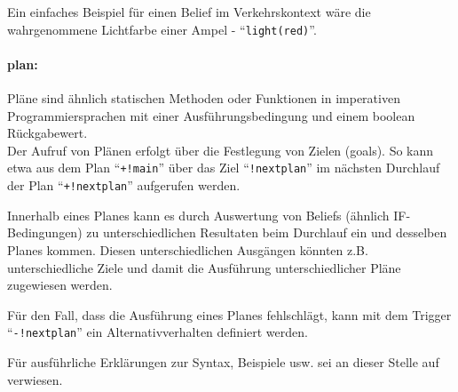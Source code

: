 Ein einfaches Beispiel für einen Belief im Verkehrskontext wäre die wahrgenommene Lichtfarbe einer Ampel - \enquote{\texttt{light(red)}}.

\paragraph*{plan:}
Pläne sind ähnlich statischen Methoden oder Funktionen in imperativen Programmiersprachen mit einer Ausführungsbedingung und einem boolean Rückgabewert.
\\
Der Aufruf von Plänen erfolgt über die Festlegung von Zielen (goals).
So kann etwa aus dem Plan \enquote{\texttt{+!main}} über das Ziel \enquote{\texttt{!nextplan}} im nächsten Durchlauf der Plan \enquote{\texttt{+!nextplan}} aufgerufen werden.

Innerhalb eines Planes kann es durch Auswertung von Beliefs (ähnlich IF-Bedingungen) zu unterschiedlichen Resultaten beim Durchlauf ein und desselben Planes kommen.
Diesen unterschiedlichen Ausgängen könnten z.B. unterschiedliche Ziele und damit die Ausführung unterschiedlicher Pläne zugewiesen werden.

Für den Fall, dass die Ausführung eines Planes fehlschlägt, kann mit dem Trigger \enquote{\texttt{-!nextplan}} ein Alternativverhalten definiert werden.

\par\vspace{2.5em}
Für ausführliche Erklärungen zur Syntax, Beispiele usw. sei an dieser Stelle auf \cite{lightjason-web} verwiesen.
